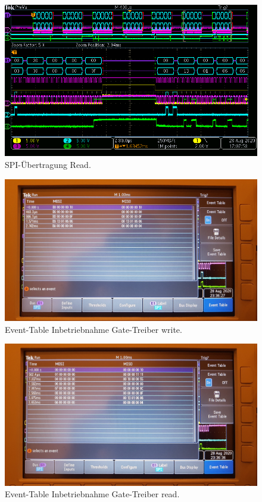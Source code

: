 \begin{figure}[H]
\center
\includegraphics[width = \textwidth]{graphics/TMC6200_Lesen}
\caption{SPI-Übertragung Read.}
\label{fig:TMC6200_Lesen}
\end{figure}

\begin{figure}[H]
\center
\includegraphics[width = \textwidth]{graphics/TMC6200_EventTable_Beschreiben_Bild}
\caption{Event-Table Inbetriebnahme Gate-Treiber write.}
\label{fig:TMC6200_EventTable_Beschreiben_Bild}
\end{figure}

\begin{figure}[H]
\center
\includegraphics[width = \textwidth]{graphics/TMC6200_EventTable_Lesen_Bild}
\caption{Event-Table Inbetriebnahme Gate-Treiber read.}
\label{fig:TMC6200_EventTable_Lesen_Bild}
\end{figure}

